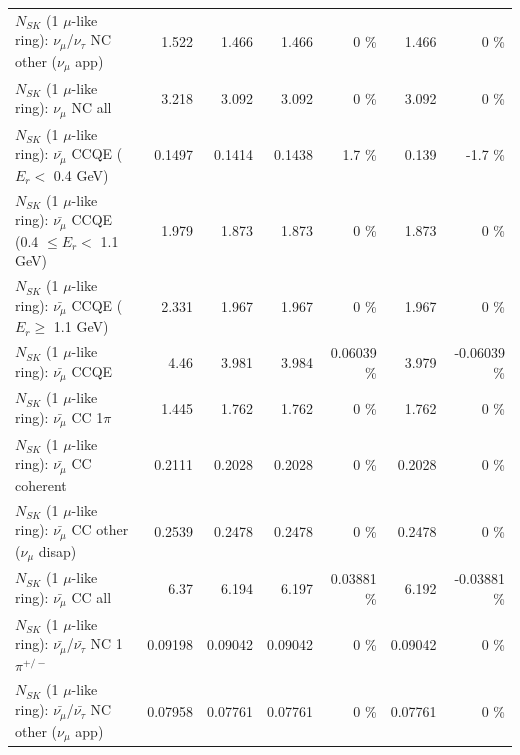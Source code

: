\begin{table}
\begin{tabular}{| l | r | r | r  r | r  r |}
     $N_{SK}$ (1 $\mu$-like ring): $\nu_\mu$/$\nu_\tau$ NC other ($\nu_\mu$ app) &           1.522 &           1.466 &           1.466 &        0 \%  &           1.466 &        0 \%  \\ 
                                $N_{SK}$ (1 $\mu$-like ring): $\nu_{\mu}$ NC all &           3.218 &           3.092 &           3.092 &        0 \%  &           3.092 &        0 \%  \\ 
\hline
\hline
\hline
          $N_{SK}$ (1 $\mu$-like ring): $\bar{\nu_\mu}$ CCQE ($E_{r} <$ 0.4 GeV) &          0.1497 &          0.1414 &          0.1438 &      1.7 \%  &           0.139 &     -1.7 \%  \\ 
 $N_{SK}$ (1 $\mu$-like ring): $\bar{\nu_\mu}$ CCQE (0.4 $\leq E_{r} <$ 1.1 GeV) &           1.979 &           1.873 &           1.873 &        0 \%  &           1.873 &        0 \%  \\ 
       $N_{SK}$ (1 $\mu$-like ring): $\bar{\nu_\mu}$ CCQE ($E_{r} \geq$ 1.1 GeV) &           2.331 &           1.967 &           1.967 &        0 \%  &           1.967 &        0 \%  \\ 
\hline
                              $N_{SK}$ (1 $\mu$-like ring): $\bar{\nu_\mu}$ CCQE &            4.46 &           3.981 &           3.984 &  0.06039 \%  &           3.979 & -0.06039 \%  \\ 
                         $N_{SK}$ (1 $\mu$-like ring): $\bar{\nu_\mu}$ CC 1$\pi$ &           1.445 &           1.762 &           1.762 &        0 \%  &           1.762 &        0 \%  \\ 
                       $N_{SK}$ (1 $\mu$-like ring): $\bar{\nu_\mu}$ CC coherent &          0.2111 &          0.2028 &          0.2028 &        0 \%  &          0.2028 &        0 \%  \\ 
        $N_{SK}$ (1 $\mu$-like ring): $\bar{\nu_\mu}$ CC other ($\nu_\mu$ disap) &          0.2539 &          0.2478 &          0.2478 &        0 \%  &          0.2478 &        0 \%  \\ 
                          $N_{SK}$ (1 $\mu$-like ring): $\bar{\nu_{\mu}}$ CC all &            6.37 &           6.194 &           6.197 &  0.03881 \%  &           6.192 & -0.03881 \%  \\ 
\hline
  $N_{SK}$ (1 $\mu$-like ring): $\bar{\nu_\mu}$/$\bar{\nu_\tau}$ NC 1$\pi^{+/-}$ &         0.09198 &         0.09042 &         0.09042 &        0 \%  &         0.09042 &        0 \%  \\ 
$N_{SK}$ (1 $\mu$-like ring): $\bar{\nu_\mu}$/$\bar{\nu_\tau}$ NC other ($\nu_\mu$ app) &         0.07958 &         0.07761 &         0.07761 &        0 \%  &         0.07761 &        0 \%  \\ 

\end{tabular}
\end{table}
